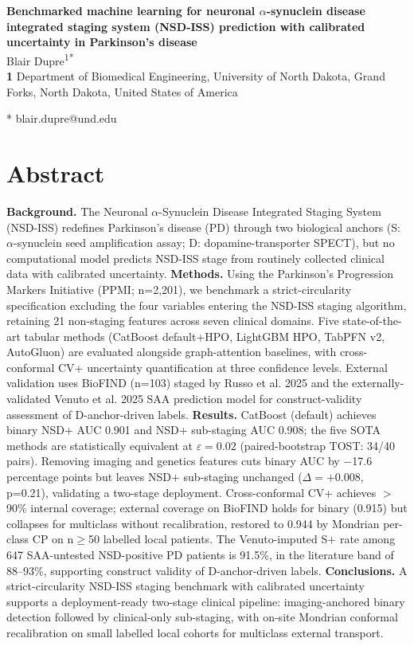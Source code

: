 \documentclass[10pt,letterpaper]{article}
\begin{document}
\vspace*{0.2in}

\begin{flushleft}
{\Large
\textbf{Benchmarked machine learning for neuronal $\alpha$-synuclein disease integrated staging system (NSD-ISS) prediction with calibrated uncertainty in Parkinson's disease}
}
\newline
\\
Blair Dupre\textsuperscript{1*}
\\
\bigskip
\textbf{1} Department of Biomedical Engineering, University of North Dakota, Grand Forks, North Dakota, United States of America
\\
\bigskip

* blair.dupre@und.edu

\end{flushleft}

\section*{Abstract}
\textbf{Background.} The Neuronal $\alpha$-Synuclein Disease Integrated Staging System (NSD-ISS) redefines Parkinson's disease (PD) through two biological anchors (S: $\alpha$-synuclein seed amplification assay; D: dopamine-transporter SPECT), but no computational model predicts NSD-ISS stage from routinely collected clinical data with calibrated uncertainty. \textbf{Methods.} Using the Parkinson's Progression Markers Initiative (PPMI; n=2,201), we benchmark a strict-circularity specification excluding the four variables entering the NSD-ISS staging algorithm, retaining 21 non-staging features across seven clinical domains. Five state-of-the-art tabular methods (CatBoost default+HPO, LightGBM HPO, TabPFN v2, AutoGluon) are evaluated alongside graph-attention baselines, with cross-conformal CV+ uncertainty quantification at three confidence levels. External validation uses BioFIND (n=103) staged by Russo et al. 2025 and the externally-validated Venuto et al. 2025 SAA prediction model for construct-validity assessment of D-anchor-driven labels. \textbf{Results.} CatBoost (default) achieves binary NSD$+$ AUC 0.901 and NSD$+$ sub-staging AUC 0.908; the five SOTA methods are statistically equivalent at $\varepsilon{=}0.02$ (paired-bootstrap TOST: 34/40 pairs). Removing imaging and genetics features cuts binary AUC by $-$17.6 percentage points but leaves NSD$+$ sub-staging unchanged ($\Delta{=}+0.008$, p=0.21), validating a two-stage deployment. Cross-conformal CV+ achieves $>$90\% internal coverage; external coverage on BioFIND holds for binary (0.915) but collapses for multiclass without recalibration, restored to 0.944 by Mondrian per-class CP on n$\geq$50 labelled local patients. The Venuto-imputed S$+$ rate among 647 SAA-untested NSD-positive PD patients is 91.5\%, in the literature band of 88--93\%, supporting construct validity of D-anchor-driven labels. \textbf{Conclusions.} A strict-circularity NSD-ISS staging benchmark with calibrated uncertainty supports a deployment-ready two-stage clinical pipeline: imaging-anchored binary detection followed by clinical-only sub-staging, with on-site Mondrian conformal recalibration on small labelled local cohorts for multiclass external transport.
\end{document}
